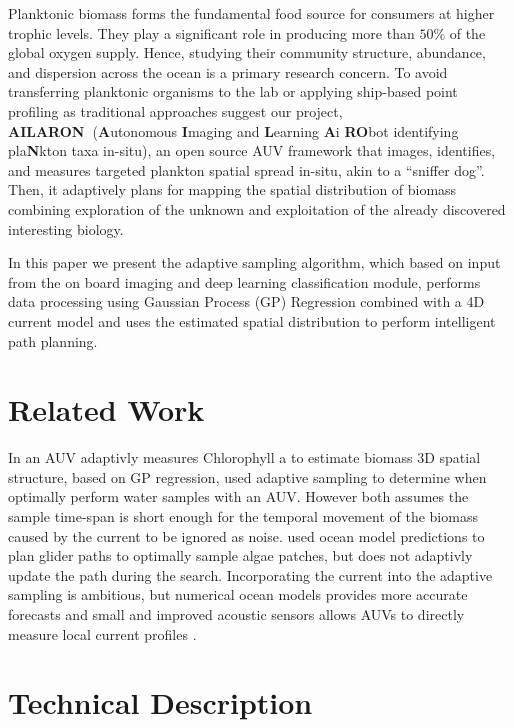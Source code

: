 \documentclass[conference]{IEEEtran}
\def\proj{{\textbf{AILARON\ }}}
\begin{document}
Planktonic biomass forms the fundamental food source for consumers at
higher trophic levels. They play a significant role in producing more
than $50\%$ of the global oxygen supply. Hence, studying their
community structure, abundance, and dispersion across the ocean is a
primary research concern. To avoid transferring planktonic organisms
to the lab or applying ship-based point profiling as traditional
approaches suggest our project,
\proj (\textbf{A}utonomous \textbf{I}maging and \textbf{L}earning \textbf{A}i \textbf{RO}bot identifying pla\textbf{N}kton taxa in-situ),  an open source AUV framework
that images, identifies, and measures targeted plankton spatial spread
in-situ, akin to a ``sniffer dog''.
Then, it adaptively plans for mapping the spatial distribution of biomass combining exploration of the unknown and exploitation of the already discovered interesting biology.

In this paper we present the adaptive sampling algorithm, which based on input from the on board imaging and deep learning classification module, performs data processing using Gaussian Process (GP) Regression combined with a 4D current model and uses the estimated spatial distribution to perform intelligent path planning.


\section{Related Work}

In \cite{fossum18b} an AUV adaptivly measures Chlorophyll a to estimate biomass 3D spatial structure, based on GP regression, \cite{das15} used adaptive sampling to determine when optimally perform water samples with an AUV.
However both assumes the sample time-span is short enough for the temporal movement of the biomass caused by the current to be ignored as noise.
\cite{smith10} used ocean model predictions to plan glider paths to optimally sample algae patches, but does not adaptivly update the path during the search.
Incorporating the current into the adaptive sampling is
ambitious, but numerical ocean models provides more accurate forecasts
and small and improved acoustic sensors allows AUVs to directly
measure local current profiles \cite{Fong2006, Cusi2017}.

\section{Technical Description}
\end{document}
